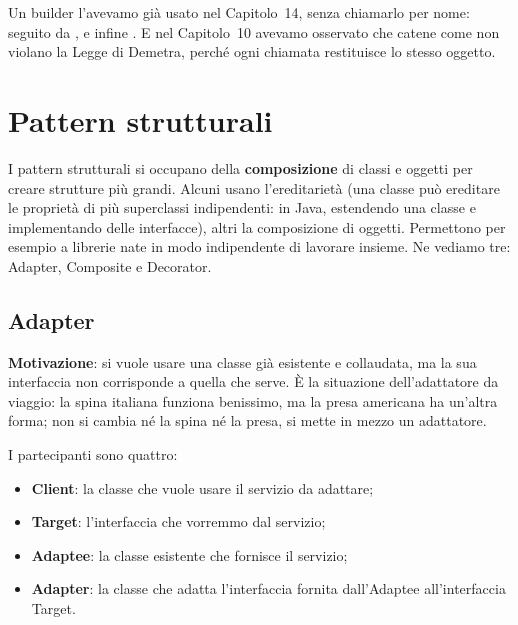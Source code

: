 Un builder l'avevamo già usato nel Capitolo~14, senza chiamarlo per nome:  seguito da
,  e infine . E nel Capitolo~10 avevamo osservato che catene come
 non violano la Legge di Demetra, perché ogni chiamata restituisce lo stesso oggetto.

\section{Pattern strutturali}

I pattern strutturali si occupano della \textbf{composizione} di classi e oggetti per creare strutture più grandi. Alcuni
usano l'ereditarietà (una classe può ereditare le proprietà di più superclassi indipendenti: in Java, estendendo una classe
e implementando delle interfacce), altri la composizione di oggetti. Permettono per esempio a librerie nate in modo
indipendente di lavorare insieme. Ne vediamo tre: Adapter, Composite e Decorator.

\subsection{Adapter}


\textbf{Motivazione}: si vuole usare una classe già esistente e collaudata, ma la sua interfaccia non corrisponde a quella
che serve. È la situazione dell'adattatore da viaggio: la spina italiana funziona benissimo, ma la presa americana ha
un'altra forma; non si cambia né la spina né la presa, si mette in mezzo un adattatore.

I partecipanti sono quattro:
\begin{itemize}
  \item \textbf{Client}: la classe che vuole usare il servizio da adattare;
  \item \textbf{Target}: l'interfaccia che vorremmo dal servizio;
  \item \textbf{Adaptee}: la classe esistente che fornisce il servizio;
  \item \textbf{Adapter}: la classe che adatta l'interfaccia fornita dall'Adaptee all'interfaccia Target.
\end{itemize}

